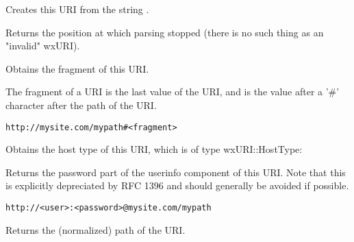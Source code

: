 \label{wxuricreate}


Creates this URI from the string .

Returns the position at which parsing stopped (there 
is no such thing as an "invalid" wxURI).



\label{wxurigetfragment}


Obtains the fragment of this URI.

The fragment of a URI is the last value of the URI,
and is the value after a '#' character after the path 
of the URI.

\tt{http://mysite.com/mypath\#<fragment>}

\label{wxurigethosttype}


Obtains the host type of this URI, which is of type
wxURI::HostType:

\twocolwidtha{7cm}
\begin{twocollist}\itemsep=0pt
\end{twocollist}


\label{wxurigetpassword}


Returns the password part of the userinfo component of
this URI.  Note that this is explicitly depreciated by
RFC 1396 and should generally be avoided if possible.

\tt{http://<user>:<password>@mysite.com/mypath}


\label{wxurigetpath}


Returns the (normalized) path of the URI.

